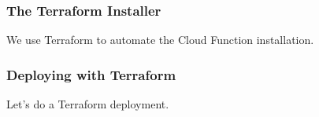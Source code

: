 \documentclass[aspectratio=169]{beamer}
\begin{document}

\begin{frame}
	\frametitle{The Terraform Installer}

	We use Terraform to automate the Cloud Function installation.

\end{frame}

\begin{frame}
	\frametitle{Deploying with Terraform}

	Let's do a Terraform deployment.

\end{frame}

\end{document}
